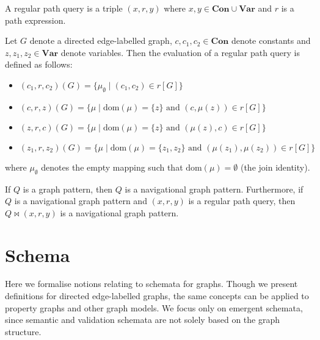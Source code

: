 \begin{definition}\label{def:regular-path-query}
    A regular path query is a triple $(x, r, y)$ where $x, y \in \textbf{Con} \cup \textbf{Var}$ and $r$ is a path expression.
\end{definition}

\begin{definition}\label{def:regular-path-query-evaluation}
    Let $G$ denote a directed edge-labelled graph, $c, c_1, c_2 \in \textbf{Con}$ denote constants and $z, z_1, z_2 \in \textbf{Var}$ denote variables. Then the evaluation of a regular path query is defined as follows:
    \begin{itemize}
        \item $(c_1, r, c_2)(G) = \{\mu_\emptyset \mid (c_1, c_2) \in r[G]\}$
        \item $(c, r, z)(G) = \{\mu \mid \text{dom}(\mu) = \{z\} \text{ and } (c, \mu(z)) \in r[G]\}$
        \item $(z, r, c)(G) = \{\mu \mid \text{dom}(\mu) = \{z\} \text{ and } (\mu(z), c) \in r[G]\}$
        \item $(z_1, r, z_2)(G) = \{\mu \mid \text{dom}(\mu) = \{z_1, z_2\} \text{ and } (\mu(z_1), \mu(z_2)) \in r[G]\}$
    \end{itemize}
    where $\mu_\emptyset$ denotes the empty mapping such that $\text{dom}(\mu) = \emptyset$ (the join identity).
\end{definition}

\begin{definition}\label{def:navigational-graph-pattern}
    If $Q$ is a graph pattern, then $Q$ is a navigational graph pattern. Furthermore, if $Q$ is a navigational graph pattern and $(x, r, y)$ is a regular path query, then $Q \Join (x, r, y)$ is a navigational graph pattern.
\end{definition}

\section{Schema}\label{app:schema}
Here we formalise notions relating to schemata for graphs. Though we present definitions for directed edge-labelled graphs, the same concepts can be applied to property graphs and other graph models. We focus only on emergent schemata, since semantic and validation schemata are not solely based on the graph structure.

